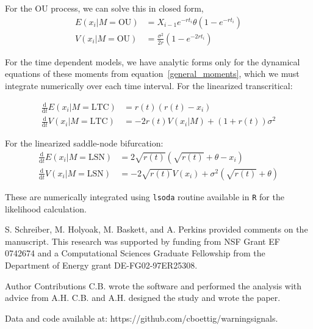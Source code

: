 \documentclass{pnastwo}
\newcommand{\ud}{\mathrm{d}}
\begin{document}
\begin{article}
For the OU process, we can solve this in closed form, 
\begin{align}
  E(x_i| M = \text{OU}) &= X_{i-1} e^{-r t_i} \theta \left(1 - e^{-rt_i} \right) \\
V(x_i| M = \text{OU}) &= \frac{\sigma^2}{2 r} \left(1 - e^{-2 r t_i} \right)
\label{OUsoln}
\end{align}

For the time dependent models, we have analytic forms only for the dynamical equations of these moments from equation~\eqref{general_moments}, which we must integrate numerically over each time interval. For the linearized transcritical:

\begin{align}
\frac{\ud }{\ud t} E(x_i| M = \text{LTC})&=  r(t)(r(t) - x_i) \\
\frac{\ud}{\ud t} V(x_i| M = \text{LTC}) &=  -2 r(t) V(x_i|M) + (1+r(t))\sigma^2 
\label{LTCsoln}
\end{align}

For the linearized saddle-node bifurcation:
\begin{align}
\frac{\ud }{\ud t} E(x_i| M = \text{LSN})&=  2\sqrt{r(t)}(\sqrt{r(t)}+\theta - x_i) \\
\frac{\ud}{\ud t} V(x_i| M = \text{LSN}) &=  -2 \sqrt{r(t)} V(x_i) + \sigma^2 ( \sqrt{r(t)}+\theta )
\label{LSNsoln}
\end{align}

These are numerically integrated using \texttt{lsoda} routine available in \texttt{R} for the likelihood calculation.  

                           

                             \begin{acknowledgments}

S. Schreiber, M. Holyoak, M. Baskett, and A. Perkins provided comments on the manuscript.  This research was supported by funding from NSF Grant EF 0742674 and a Computational Sciences Graduate Fellowship from the Department of Energy grant DE-FG02-97ER25308.

Author Contributions
C.B. wrote the software and performed the analysis with advice from A.H.  C.B. and A.H. designed the study and wrote the paper.  

Data and code available at: https://github.com/cboettig/warningsignals. 
                             \end{acknowledgments}


\end{article}
\end{document}
